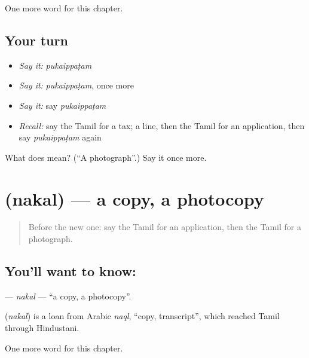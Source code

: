 \begin{grammarlens}[title={What you've built}]
One more word for this chapter.
\end{grammarlens}

\subsection*{Your turn}
\begin{itemize}
\raggedright
  \item \emph{Say it:} \emph{pukaippaṭam}
  \item \emph{Say it:} \emph{pukaippaṭam}, once more
  \item \emph{Say it:} say \emph{pukaippaṭam}
  \item \emph{Recall:} say the Tamil for a tax; a line, then the Tamil for an application, then say \emph{pukaippaṭam} again
\end{itemize}

\begin{tcolorbox}[breakable,colback=teal!4,colframe=teal!35!black,title={Before you move on}]
What does  mean? (\textquotedblleft{}A photograph\textquotedblright{}.) Say it once more.
\end{tcolorbox}
\section[\texorpdfstring{\ta{நகல்} (nakal)}{நகல் (nakal)}]{ (nakal) — a copy, a photocopy}

\label{lesson:TA-C272-nakal}



\begin{quote}
Before the new one: say the Tamil for an application, then the Tamil for a photograph.
\end{quote}

\subsection*{You'll want to know: }
\textbf{} — \emph{nakal} — \textquotedblleft{}a copy, a photocopy\textquotedblright{}.

\begin{cousinweb}
\textbf{} (\emph{nakal}) is a loan from Arabic \emph{naql}, \textquotedblleft{}copy, transcript\textquotedblright{}, which reached Tamil through Hindustani.
\end{cousinweb}

\begin{grammarlens}[title={What you've built}]
One more word for this chapter.
\end{grammarlens}

